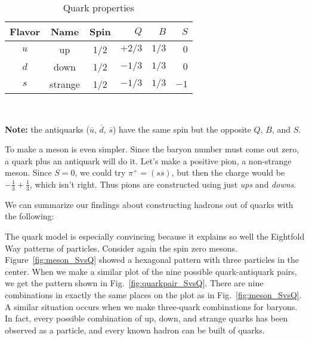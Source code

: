 \begin{table}[tbp]
\begin{center}
\caption{Quark properties} \label{table:quarks}
\begin{tabular}[tbp]{cccrrr}
Flavor & Name & Spin & $Q$ & $B$ & $S$ \\
\hline\hline
$u$ & up      & 1/2 & $+2/3$ & $1/3$ & $ 0$ \\[0.5ex]
$d$ & down    & 1/2 & $-1/3$ & $1/3$ & $ 0$ \\[0.5ex]
$s$ & strange & 1/2 & $-1/3$ & $1/3$ & $-1$ \\
\hline
\end{tabular}\\[0.5ex]
\end{center}
\textbf{Note:} the antiquarks ($\overline u$, $\overline d$, $\overline s$)
have the same spin but the opposite $Q$, $B$, and $S$.
\end{table}

To make a meson is even simpler.  Since the baryon number must
come out zero, a quark plus an antiquark will do it.  Let's make a
positive pion, a non-strange meson.  Since $S= 0$, we could try
$\pi^+ =(s\overline s)$, but then the charge would be $-\frac{1}{3}
+ \frac{1}{3}$, which isn't right.  Thus pions are constructed
using just {\em ups} and {\em downs}.

We can summarize our findings about constructing hadrons out of
quarks with the following:

\boxittext{
\begin{description}
\item[baryons] contain three quarks ($qqq$) \item[antibaryons]
contain three antiquarks ($\overline q\overline
  q\overline q$)
\item[mesons] contain a quark-antiquark ($q\overline q$)
\end{description}
}

The quark model is especially convincing because it explains so
well the Eightfold Way patterns of particles.  Consider again the
spin zero mesons.  Figure~\ref{fig:meson_SvsQ} showed a hexagonal
pattern with three particles in the center.  When we make a
similar plot of the nine possible quark-antiquark pairs, we get
the pattern shown in Fig.~\ref{fig:quarkpair_SvsQ}.  There are
nine combinations in exactly the same places on the plot as in
Fig.~\ref{fig:meson_SvsQ}.  A similar situation occurs when we
make three-quark combinations for baryons.  In fact, every
possible combination of up, down, and strange quarks has been
observed as a particle, and every known hadron can be built of
quarks.

